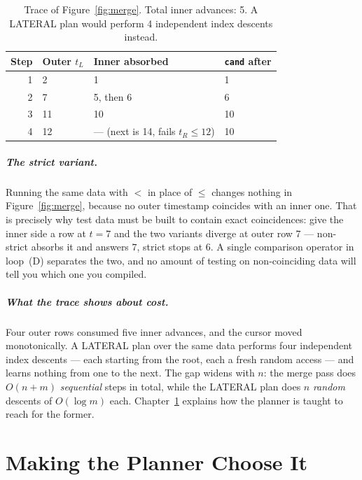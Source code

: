 \documentclass[11pt,a4paper]{report}
\theoremstyle{definition}
\theoremstyle{plain}
\newcommand{\code}[1]{\texttt{\small #1}}
\begin{document}
\begin{table}[h]
\centering
\footnotesize
\renewcommand{\arraystretch}{1.15}
\begin{tabular}{@{}rlll@{}}
\toprule
\textbf{Step} & \textbf{Outer $t_L$} & \textbf{Inner absorbed} & \textbf{\code{cand} after}\\
\midrule
1 & 2  & 1               & 1\\
2 & 7  & 5, then 6       & 6\\
3 & 11 & 10              & 10\\
4 & 12 & --- (next is 14, fails $t_R \le 12$) & 10\\
\bottomrule
\end{tabular}
\caption{Trace of Figure~\ref{fig:merge}. Total inner advances: 5. A LATERAL plan would
perform 4 independent index descents instead.}
\end{table}

\paragraph{The strict variant.} Running the same data with $<$ in place of $\le$ changes
nothing in Figure~\ref{fig:merge}, because no outer timestamp coincides with an inner one.
That is precisely why test data must be built to contain exact coincidences: give the inner
side a row at $t = 7$ and the two variants diverge at outer row $7$ --- non-strict absorbs it
and answers $7$, strict stops at $6$. A single comparison operator in loop~(D) separates the
two, and no amount of testing on non-coinciding data will tell you which one you compiled.

\paragraph{What the trace shows about cost.} Four outer rows consumed five inner advances,
and the cursor moved monotonically. A LATERAL plan over the same data performs four
independent index descents --- each starting from the root, each a fresh random access ---
and learns nothing from one to the next. The gap widens with $n$: the merge pass does
$O(n + m)$ \emph{sequential} steps in total, while the LATERAL plan does $n$ \emph{random}
descents of $O(\log m)$ each. Chapter~\ref{ch:planner} explains how the planner is taught to
reach for the former.


\chapter{Making the Planner Choose It}\label{ch:planner}
\end{document}
